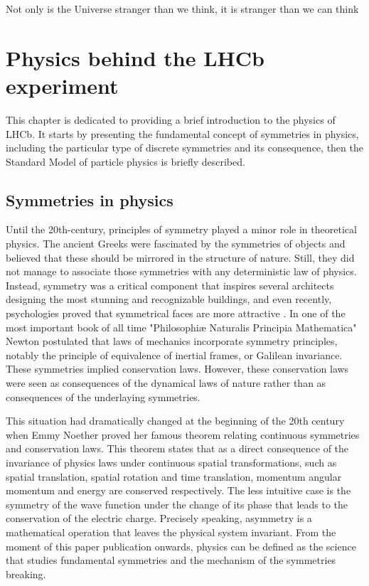 \begin{savequote}[75mm]
Not only is the Universe stranger than we think, it is stranger than we can think
\end{savequote}


\chapter{Physics behind the LHCb experiment }
\label{chapter:physics}
This chapter is dedicated to providing a brief introduction to the physics of LHCb. It starts by presenting the fundamental concept of symmetries in physics, including the particular type of discrete symmetries and its consequence, then the Standard Model of particle physics is briefly described. 

\section{Symmetries in physics}
Until the 20th-century, principles of symmetry played a minor role in theoretical physics. The ancient Greeks were fascinated by the symmetries of objects and believed that these should be mirrored in the structure of nature. Still, they did not manage to associate those symmetries with any deterministic law of physics. Instead, symmetry was a critical component that inspires several architects designing the most stunning and recognizable buildings, and even recently, psychologies proved that symmetrical faces are more attractive \cite{faces}. 
In one of the most important book of all time "Philosophiæ Naturalis Principia Mathematica" \cite{newton} 
Newton postulated that laws of mechanics incorporate symmetry principles, notably the principle of equivalence of inertial frames, or Galilean invariance. These symmetries implied conservation laws. However, these conservation laws were seen as consequences of the dynamical laws of nature rather than as consequences of the underlaying symmetries.  

This situation had dramatically changed at the beginning of the 20th century when Emmy Noether proved her famous theorem relating continuous symmetries and conservation laws.
This theorem states that as a direct consequence of the invariance of physics laws under continuous spatial transformations, such as spatial translation, spatial rotation and time translation, momentum angular momentum and energy are conserved respectively. The less intuitive case is the symmetry of the wave function under the change of its phase that leads to the conservation of the electric charge. Precisely speaking, asymmetry is a mathematical operation that leaves the physical system invariant. 
From the moment of this paper publication onwards, physics can be defined as the science that studies fundamental symmetries and the mechanism of the symmetries breaking.  

